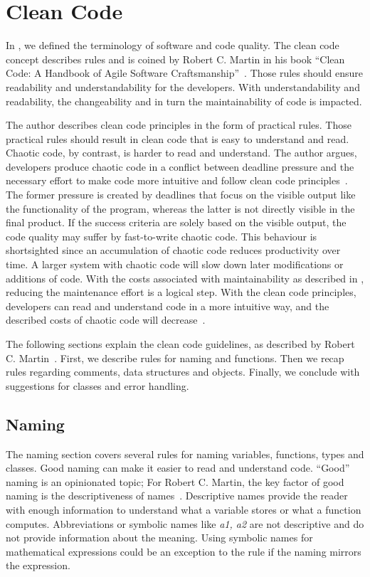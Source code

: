 \section{Clean Code}\label{sec:clean_code}
In , we defined the terminology of software and code quality. The clean code concept describes rules and is coined by Robert C. Martin in his book \enquote{Clean Code: A Handbook of Agile Software Craftsmanship}~\cite{martin_clean_2009}. Those rules should ensure readability and understandability for the developers. With understandability and readability, the changeability and in turn the maintainability of code is impacted.   

The author describes clean code principles in the form of practical rules. Those practical rules should result in clean code that is easy to understand and read. Chaotic code, by contrast, is harder to read and understand. The author argues, developers produce chaotic code in a conflict between deadline pressure and the necessary effort to make code more intuitive and follow clean code principles~\cite{martin_clean_2009}. The former pressure is created by deadlines that focus on the visible output like the functionality of the program, whereas the latter is not directly visible in the final product. If the success criteria are solely based on the visible output, the code quality may suffer by fast-to-write chaotic code. This behaviour is shortsighted since an accumulation of chaotic code reduces productivity over time. A larger system with chaotic code will slow down later modifications or additions of code. With the costs associated with maintainability as described in , reducing the maintenance effort is a logical step. With the clean code principles, developers can read and understand code in a more intuitive way, and the described costs of chaotic code will decrease~\cite{martin_clean_2009}.

The following sections explain the clean code guidelines, as described by Robert C. Martin~\cite{martin_clean_2009}. First, we describe rules for naming and functions. Then we recap rules regarding comments, data structures and objects. Finally, we conclude with suggestions for classes and error handling.

\subsection{Naming}\label{sec:naming}
The naming section covers several rules for naming variables, functions, types and classes.
Good naming can make it easier to read and understand code. \enquote{Good} naming is an opinionated topic; For Robert C. Martin, the key factor of good naming is the descriptiveness of names~\cite{martin_clean_2009}. Descriptive names provide the reader with enough information to understand what a variable stores or what a function computes. Abbreviations or symbolic names like \textit{a1, a2} are not descriptive and do not provide information about the meaning. Using symbolic names for mathematical expressions could be an exception to the rule if the naming mirrors the expression.

